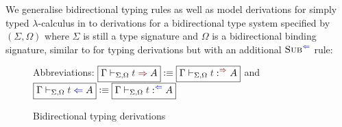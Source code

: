 We generalise bidirectional typing rules as well as model derivations for simply typed $\lambda$-calculus in  to derivations for a bidirectional type system specified by $(\Sigma, \Omega)$ where $\Sigma$ is still a type signature and $\Omega$ is a bidirectional binding signature, similar to  for typing derivations but with an additional $\ChkRule{Sub}$ rule:
\begin{definition}\label{def:bidirectional-typing-derivations}\label{def:mode-derivations}
  \begin{figure}
    \centering
    \small
    Abbreviations: $\boxed{\Gamma \vdash_{\Sigma, \Omega} \isTerm{t} \syn A} \defeq \boxed{\Gamma \vdash_{\Sigma, \Omega} \isTerm{t} :^{\syn} A}$ and $\boxed{\Gamma \vdash_{\Sigma, \Omega} \isTerm{t} \chk A} \defeq \boxed{\Gamma \vdash_{\Sigma, \Omega} \isTerm{t} :^{\chk} A}$
    \caption{Bidirectional typing derivations}
    \label{fig:bidirectional-typing-derivations}
  \end{figure}
  \begin{figure}
    \centering
    \small

\end{figure}
\end{definition}

